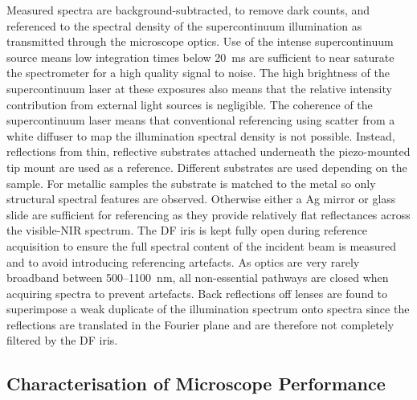 \documentclass{article}
\begin{document}
Measured spectra are background-subtracted, to remove dark counts, and referenced to the spectral density of the supercontinuum illumination as transmitted through the microscope optics. Use of the intense supercontinuum source means low integration times below \SI{20}{ms} are sufficient to near saturate the spectrometer for a high quality signal to noise. The high brightness of the supercontinuum laser at these exposures also means that the relative intensity contribution from external light sources is negligible.
The coherence of the supercontinuum laser means that conventional referencing using scatter from a white diffuser to map the illumination spectral density is not possible. Instead, reflections from thin, reflective substrates attached underneath the piezo-mounted tip mount are used as a reference. Different substrates are used depending on the sample. For metallic samples the substrate is matched to the metal so only structural spectral features are observed. Otherwise either a Ag mirror or glass slide are sufficient for referencing as they provide relatively flat reflectances across the visible-NIR spectrum. The DF iris is kept fully open during reference acquisition to ensure the full spectral content of the incident beam is measured and to avoid introducing referencing artefacts. As optics are very rarely broadband between 500--\SI{1100}{nm}, all non-essential pathways are closed when acquiring spectra to prevent artefacts. Back reflections off lenses are found to superimpose a weak duplicate of the illumination spectrum onto spectra since the reflections are translated in the Fourier plane and are therefore not completely filtered by the DF iris.

\subsection{Characterisation of Microscope Performance}
\end{document}
